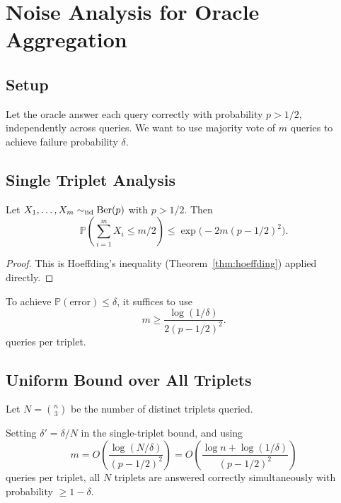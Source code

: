 \chapter{Noise Analysis for Oracle Aggregation}
\label{app:noise_analysis}

\section{Setup}

Let the oracle answer each query correctly with probability $p > 1/2$, independently across queries. We want to use majority vote of $m$ queries to achieve failure probability $\delta$.

\section{Single Triplet Analysis}

\begin{theorem}
Let $X_1, \ldots, X_m \sim_{\rm iid} \operatorname{Ber}(p)$ with $p > 1/2$. Then
\[
\mathbb{P}\!\left(\sum_{i=1}^m X_i \leq m/2\right) \leq \exp\!\bigl(-2m(p - 1/2)^2\bigr).
\]
\end{theorem}

\begin{proof}
This is Hoeffding's inequality (Theorem~\ref{thm:hoeffding}) applied directly.
\end{proof}

\begin{corollary}
To achieve $\mathbb{P}(\text{error}) \leq \delta$, it suffices to use
\[
m \geq \frac{\log(1/\delta)}{2(p - 1/2)^2}.
\]
queries per triplet.
\end{corollary}

\section{Uniform Bound over All Triplets}

Let $N = \binom{n}{3}$ be the number of distinct triplets queried.

\begin{theorem}
Setting $\delta' = \delta / N$ in the single-triplet bound, and using
\[
m = O\!\left(\frac{\log(N/\delta)}{(p - 1/2)^2}\right) = O\!\left(\frac{\log n + \log(1/\delta)}{(p-1/2)^2}\right)
\]
queries per triplet, all $N$ triplets are answered correctly simultaneously with probability $\geq 1 - \delta$.
\end{theorem}

